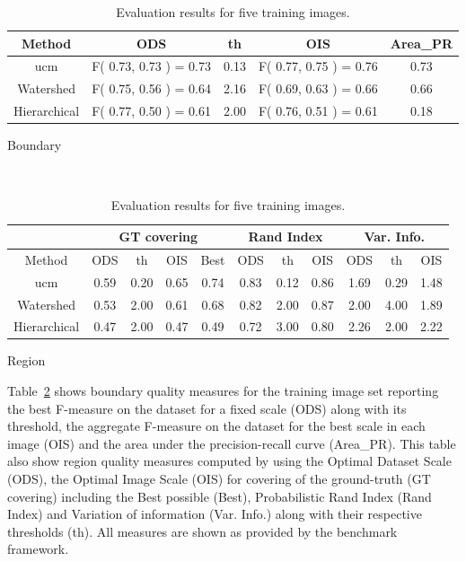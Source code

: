 \documentclass[10pt,twocolumn,letterpaper]{article}
\begin{document}
\begin{table}
\begin{center}
\begin{subtable}{.5\textwidth}
\begin{center}
\begin{tabular}{|c|c|c|c|c|}
\hline
Method & ODS & th & 
OIS & Area\_PR \\
\hline\hline
ucm & F( 0.73, 0.73 ) = 0.73 & 0.13 & 
F( 0.77, 0.75 ) = 0.76 & 0.73\\
Watershed & F( 0.75, 0.56 ) = 0.64 & 2.16 & 
F( 0.69, 0.63 ) = 0.66 & 0.66\\
Hierarchical & F( 0.77, 0.50 ) = 0.61 & 2.00 &
F( 0.76, 0.51 ) = 0.61 & 0.18 \\
\hline
\end{tabular}
\caption{Boundary}
\end{center}
\end{subtable}
~
\begin{subtable}{.5\textwidth}
\begin{center}
\begin{tabular}{|c|c|c|c|c||c|c|c||c|c|c|}
\hline
\multicolumn{1}{|c|}{} &
\multicolumn{4}{c||}{GT covering} &
\multicolumn{3}{c||}{Rand Index} &
\multicolumn{3}{c|}{Var. Info.} \\
\hline
Method & ODS & th & OIS &  Best & 
ODS & th & OIS  & ODS & th & OIS \\
\hline\hline
ucm & 0.59 & 0.20 & 0.65 & 0.74 & 0.83 & 0.12 & 0.86 &
1.69 & 0.29 & 1.48 \\
Watershed & 0.53 & 2.00 & 0.61 & 0.68 & 0.82 & 2.00 & 0.87 &
2.00 & 4.00 & 1.89 \\
Hierarchical & 0.47 & 2.00 & 0.47 & 0.49 & 0.72 & 3.00 & 0.80 &
2.26 & 2.00 & 2.22 \\
\hline
\end{tabular}
\caption{Region}
\end{center}
\end{subtable}
\caption{Evaluation results for five training images.}
\label{tab:P_RT}
\end{center}
\end{table}

Table~\ref{tab:P_RT} shows boundary quality measures for the training image set reporting the best F-measure on the dataset for a fixed scale (ODS) along with its threshold, the aggregate F-measure on the dataset for the best scale in each image (OIS) and the area under the precision-recall curve (Area\_PR). This table also show region quality measures computed by using the Optimal Dataset Scale (ODS), the Optimal Image Scale (OIS) for  covering of the ground-truth (GT covering) including the Best possible (Best), Probabilistic Rand Index (Rand Index) and Variation of information (Var. Info.) along with their respective thresholds (th). All measures are shown as provided by the benchmark framework.
\end{document}
